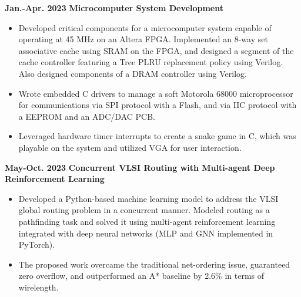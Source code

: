 \documentclass[11pt,a4paper,sans]{moderncv}
\begin{document}
\cventry
{\textnormal{\textbf{Jan.-Apr. 2023}}}
{\textnormal{\textbf{Microcomputer System Development}}}
{}{}{}
{
    \begin{itemize}
    \item Developed critical components for a microcomputer system capable of operating at 45 MHz on an Altera FPGA. Implemented an 8-way set associative cache using SRAM on the FPGA, and designed a segment of the cache controller featuring a Tree PLRU replacement policy using Verilog. Also designed components of a DRAM controller using Verilog.
    \item Wrote embedded C drivers to manage a soft Motorola 68000 microprocessor for communications via SPI protocol with a Flash, and via IIC protocol with a EEPROM and an ADC/DAC PCB.
    \item Leveraged hardware timer interrupts to create a snake game in C, which was playable on the system and utilized VGA for user interaction.
    \end{itemize}
}

\cventry
{\textnormal{\textbf{May-Oct. 2023}}}
{\textnormal{\textbf{Concurrent VLSI Routing with Multi-agent
Deep Reinforcement Learning}}}
{}{}{}
{
    \begin{itemize}
        \item Developed a Python-based machine learning model to address the VLSI global routing problem in a concurrent manner. Modeled routing as a pathfinding task and solved it using multi-agent reinforcement learning integrated with deep neural networks (MLP and GNN implemented in PyTorch).
        \item The proposed work overcame the traditional net-ordering issue, guaranteed zero overflow, and outperformed an A* baseline by 2.6\% in terms of wirelength.
        \end{itemize}
}

\end{document}
